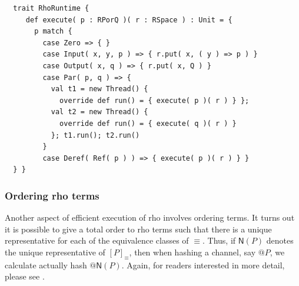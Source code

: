 \begin{lstlisting}
  trait RhoRuntime {
     def execute( p : RPorQ )( r : RSpace ) : Unit = {
       p match {
         case Zero => { }
         case Input( x, y, p ) => { r.put( x, ( y ) => p ) }
         case Output( x, q ) => { r.put( x, Q ) }
         case Par( p, q ) => {
           val t1 = new Thread() {
             override def run() = { execute( p )( r ) } };
           val t2 = new Thread() {
             override def run() = { execute( q )( r ) }
           }; t1.run(); t2.run()
         }
         case Deref( Ref( p ) ) => { execute( p )( r ) } }
  } }
\end{lstlisting}

\subsubsection{Ordering rho terms}

Another aspect of efficient execution of rho involves ordering
terms. It turns out it is possible to give a total order to rho terms
such that there is a unique representative for each of the equivalence
classes of $\equiv$. Thus, if $\mathsf{N}(P)$ denotes the unique
representative of $[P]_{\equiv}$, then when hashing a channel, say
$\mathsf{@}P$, we calculate actually hash
$\mathsf{@}\mathsf{N}(P)$. Again, for readers interested in more
detail, please see \cite{f1r3fly-io:githubrepo}.

